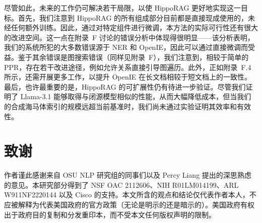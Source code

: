 \documentclass[11pt,UTF8,fontset=fandol]{ctexart}
\begin{document}
尽管如此，未来的工作仍可解决若干局限，以使 HippoRAG 更好地实现这一目标。首先，我们注意到 HippoRAG 的所有组成部分目前都是直接现成使用的，未经任何额外训练。因此，通过对特定组件进行微调，本方法的实际可行性还有很大的改进空间。这一点在附录~F 讨论的错误分析中体现得很明显——该分析表明，我们的系统所犯的大多数错误源于 NER 和 OpenIE，因此可以通过直接微调而受益。鉴于其余错误是图搜索错误（同样见附录~F），我们注意到，相较于简单的 PPR，存在若干改进途径，例如允许关系直接引导图遍历。此外，正如附录~F.4 所示，还需开展更多工作，以提升 OpenIE 在长文档相较于短文档上的一致性。最后，也许最重要的是，HippoRAG 的可扩展性仍有待进一步验证。尽管我们证明了 Llama-3.1 能够取得与闭源模型相似的性能，从而大幅降低成本，但当我们的合成海马体索引的规模远超当前基准时，我们尚未通过实验证明其效率和有效性。

\section*{致谢}

作者谨此感谢来自 OSU NLP 研究组的同事们以及 Percy Liang 提出的深思熟虑的意见。本研究部分得到了 NSF OAC 2112606、NIH R01LM014199、ARL W911NF2220144 以及 Cisco 的支持。本文所含的观点和结论仅代表作者本人，不应被解释为代表美国政府的官方政策（无论是明示的还是暗示的）。美国政府有权出于政府目的复制和分发重印本，而不受本文任何版权声明的限制。
\end{document}
